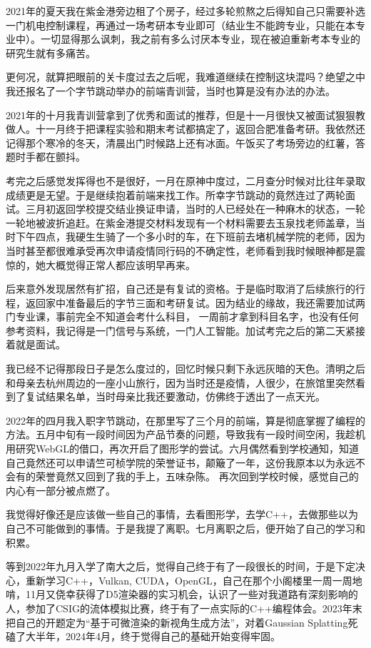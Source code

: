 2021年的夏天我在紫金港旁边租了个房子，经过多轮煎熬之后得知自己只需要补选一门机电控制课程，再通过一场考研本专业即可（结业生不能跨专业，只能在本专业中）。一切显得那么讽刺，我之前有多么讨厌本专业，现在被迫重新考本专业的研究生就有多痛苦。

更何况，就算把眼前的关卡度过去之后呢，我难道继续在控制这块混吗？绝望之中我还报名了一个字节跳动举办的前端青训营，当时也算是没有办法的办法。

2021年的十月我青训营拿到了优秀和面试的推荐，但是十一月很快又被面试狠狠教做人。十一月终于把课程实验和期末考试都搞定了，返回合肥准备考研。我依然还记得那个寒冷的冬天，清晨出门时候路上还有冰面。午饭买了考场旁边的红薯，答题时手都在颤抖。

考完之后感觉发挥得也不是很好，一月在原神中度过，二月查分时候对比往年录取成绩更是无望。于是继续抱着前端来找工作。所幸字节跳动的竟然连过了两轮面试。三月初返回学校提交结业换证申请，当时的人已经处在一种麻木的状态，一轮一轮地被波折追赶。在紫金港提交材料发现有一个材料需要去玉泉找老师盖章，当时下午四点，我硬生生骑了一个多小时的车，在下班前去堵机械学院的老师，因为当时甚至都很难承受再次申请疫情同行码的不确定性，老师看到我时候眼神都是震惊的，她大概觉得正常人都应该明早再来。

后来意外发现居然有扩招，自己还是有复试的资格。于是临时取消了后续旅行的行程，返回家中准备最后的字节三面和考研复试。因为结业的缘故，我还需要加试两门专业课，事前完全不知道会考什么科目，
一周前才拿到科目名字，也没有任何参考资料，我记得是一门信号与系统，一门人工智能。加试考完之后的第二天紧接着就是面试。

我已经不记得那段日子是怎么度过的，回忆时候只剩下永远灰暗的天色。清明之后和母亲去杭州周边的一座小山旅行，因为当时还是疫情，人很少，在旅馆里突然看到了复试结果名单，当时母亲比我还要激动，仿佛终于透出了一点天光。

2022年的四月我入职字节跳动，在那里写了三个月的前端，算是彻底掌握了编程的方法。五月中旬有一段时间因为产品节奏的问题，导致我有一段时间空闲，我趁机用研究WebGL的借口，再次开启了图形学的尝试。六月偶然看到学校通知，知道自己竟然还可以申请竺可桢学院的荣誉证书，颠簸了一年，这份我原本以为永远不会有的荣誉竟然又回到了我的手上，五味杂陈。
再次回到学校时候，感觉自己的内心有一部分被点燃了。

我觉得好像还是应该做一些自己的事情，去看图形学，去学C++，去做那些以为自己不可能做到的事情。于是我提了离职。七月离职之后，便开始了自己的学习和积累。

等到2022年九月入学了南大之后，觉得自己终于有了一段很长的时间，于是下定决心，重新学习C++，Vulkan, CUDA，OpenGL，自己在那个小阁楼里一周一周地啃，11月又侥幸获得了D5渲染器的实习机会，认识了一些对我道路有深刻影响的人，参加了CSIG的流体模拟比赛，终于有了一点实际的C++编程体会。2023年末把自己的开题定为“基于可微渲染的新视角生成方法”，对着Gaussian Splatting死磕了大半年，2024年4月，终于觉得自己的基础开始变得牢固。

